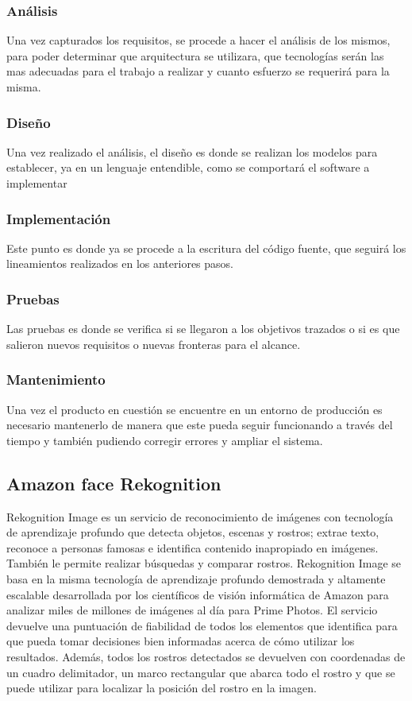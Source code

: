 \documentclass[a4paper, 12pt]{article}
\begin{document}
			\subsubsection{Análisis}
				Una vez capturados los requisitos, se procede a hacer el análisis de los mismos, para poder determinar que arquitectura se utilizara, que tecnologías serán las mas adecuadas para el trabajo a realizar y cuanto esfuerzo se requerirá para la misma.
			\subsubsection{Diseño}
				Una vez realizado el análisis, el diseño es donde se realizan los modelos para establecer, ya en un lenguaje entendible, como se comportará el software a implementar
			\subsubsection{Implementación}
				Este punto es donde ya se procede a la escritura del código fuente, que seguirá los lineamientos realizados en los anteriores pasos.
			\subsubsection{Pruebas}
				Las pruebas es donde se verifica si se llegaron a los objetivos trazados o si es que salieron nuevos requisitos o nuevas fronteras para el alcance.
			\subsubsection{Mantenimiento}
				Una vez el producto en cuestión se encuentre en un entorno de producción es necesario mantenerlo de manera que este pueda seguir funcionando a través del tiempo y también pudiendo corregir errores y ampliar el sistema.
		\subsection{Amazon face Rekognition}
			Rekognition Image es un servicio de reconocimiento de imágenes con tecnología de aprendizaje profundo que detecta objetos, escenas y rostros; extrae texto, reconoce a personas famosas e identifica contenido inapropiado en imágenes. También le permite realizar búsquedas y comparar rostros. Rekognition Image se basa en la misma tecnología de aprendizaje profundo demostrada y altamente escalable desarrollada por los científicos de visión informática de Amazon para analizar miles de millones de imágenes al día para Prime Photos. El servicio devuelve una puntuación de fiabilidad de todos los elementos que identifica para que pueda tomar decisiones bien informadas acerca de cómo utilizar los resultados. Además, todos los rostros detectados se devuelven con coordenadas de un cuadro delimitador, un marco rectangular que abarca todo el rostro y que se puede utilizar para localizar la posición del rostro en la imagen.
\end{document}
